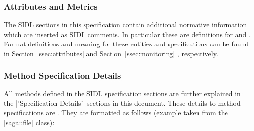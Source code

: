  \subsubsection{Attributes and Metrics}

   The SIDL sections in this specification contain additional
   normative information which are inserted as SIDL comments.
   In particular these are definitions for  and
   .  Format definitions and meaning for
   these entities and specifications can be found in
   Section~\ref{ssec:attributes}  and Section~\ref{ssec:monitoring} , respectively.

  \subsubsection{Method Specification Details}

    All methods defined in the SIDL specification sections are
    further explained in the |'Specification Details'| sections
    in this document.  These details to method specifications
    are . They are formatted as follows (example
    taken from the |saga::file| class):

   \newpage

